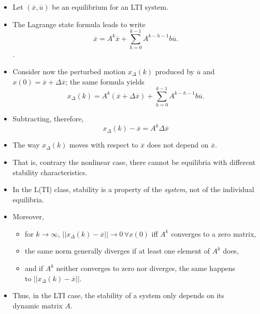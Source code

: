 \begin{frame}
\framesubtitleTC{}
\myPause
\begin{itemize}[<+-| alert@+>]
\item Let $(\overline{x},\overline{u})$ be an equilibrium for an LTI system. 
\item The Lagrange state formula leads to write
      \begin{displaymath}
       \overline{x} = A^k \overline{x} +\sum\limits_{h=0}^{k-1} A^{k-h-1}b\overline{u}.
      \end{displaymath}.
\item Consider now the  perturbed motion $x_{\Delta}(k)$ produced by $\overline{u}$ and
      $x(0)=\overline{x}+\Delta\overline{x}$; the same formula yields
      \begin{displaymath}
       x_{\Delta}(k) = A^k (\overline{x}+\Delta\overline{x}) +\sum\limits_{h=0}^{k-1} A^{k-h-1}b\overline{u}.
      \end{displaymath}
\item Subtracting, therefore,
      \begin{displaymath}
       x_{\Delta}(k)-\overline{x} = A^k\Delta\overline{x}
      \end{displaymath}
\end{itemize}
\end{frame}

\begin{frame}
\myPause
\begin{itemize}[<+-| alert@+>]
\item The way $x_{\Delta}(k)$ moves with respect to $\overline{x}$ does not depend on $\overline{x}$.
\item That is, contrary the nonlinear case, there cannot be equilibria with different stability characteristics.
\item In the L(TI) class, stability is a property of the \emph{system}, not of the individual equilibria.
\item Moreover, 
      \begin{itemize}[<+-| alert@+>]
      \item for $k\rightarrow\infty$, $||x_{\Delta}(k)-\overline{x}|| \rightarrow 0 \, \forall x(0)$  iff $A^k$
            converges to a zero matrix,
      \item the same norm generally diverges if at least one element of $A^k$ does,
      \item and if $A^k$ neither converges to zero nor diverges, the same happens\\
            to $||x_{\Delta}(k)-\overline{x}||$.
      \end{itemize}
\item Thus, in the LTI case, the stability of a system only depends on its\\
      dynamic matrix $A$.
\end{itemize}
\end{frame}

